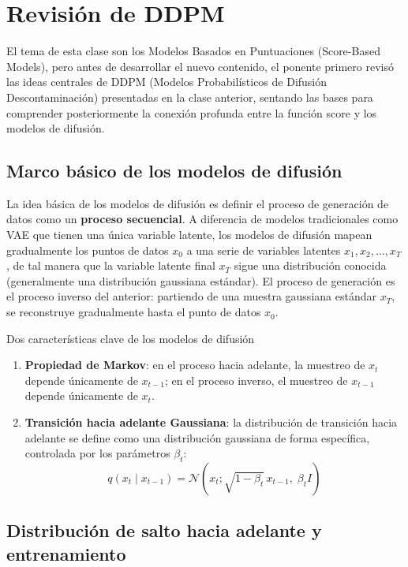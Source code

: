 \section{Revisión de DDPM}

El tema de esta clase son los Modelos Basados en Puntuaciones (Score-Based Models), pero antes de desarrollar el nuevo contenido, el ponente primero revisó las ideas centrales de DDPM (Modelos Probabilísticos de Difusión Descontaminación) presentadas en la clase anterior, sentando las bases para comprender posteriormente la conexión profunda entre la función score y los modelos de difusión.

\subsection{Marco básico de los modelos de difusión}

La idea básica de los modelos de difusión es definir el proceso de generación de datos como un \textbf{proceso secuencial}. A diferencia de modelos tradicionales como VAE que tienen una única variable latente, los modelos de difusión mapean gradualmente los puntos de datos $x_0$ a una serie de variables latentes $x_1, x_2, \ldots, x_T$, de tal manera que la variable latente final $x_T$ sigue una distribución conocida (generalmente una distribución gaussiana estándar). El proceso de generación es el proceso inverso del anterior: partiendo de una muestra gaussiana estándar $x_T$, se reconstruye gradualmente hasta el punto de datos $x_0$.

\begin{importantbox}{Dos características clave de los modelos de difusión}
\begin{enumerate}
    \item \textbf{Propiedad de Markov}: en el proceso hacia adelante, la muestreo de $x_t$ depende únicamente de $x_{t-1}$; en el proceso inverso, el muestreo de $x_{t-1}$ depende únicamente de $x_t$.
    \item \textbf{Transición hacia adelante Gaussiana}: la distribución de transición hacia adelante se define como una distribución gaussiana de forma específica, controlada por los parámetros $\beta_t$:
    $$q(x_t \mid x_{t-1}) = \mathcal{N}(x_t; \sqrt{1-\beta_t}\, x_{t-1},\; \beta_t I)$$
\end{enumerate}
\end{importantbox}

\subsection{Distribución de salto hacia adelante y entrenamiento}


